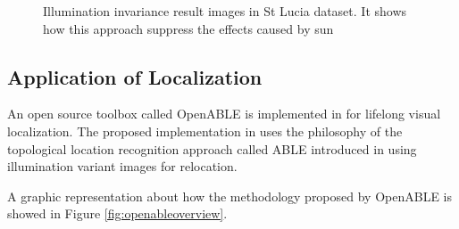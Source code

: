 \begin{figure}
	\centering
	\caption{Illumination invariance result images in St Lucia dataset. It shows how this approach suppress the effects caused by sun}
	\label{fig:iicompare1}
\end{figure}

\subsection{Application of Localization}
An open source toolbox called OpenABLE is implemented in \cite{arroyo2016openable} for lifelong visual localization. The proposed implementation in \cite{arroyo2016openable} uses the philosophy of the topological location recognition approach called ABLE introduced in \cite{arroyo2014bidirectional, arroyo2014fast, arroyo2015towards} using illumination variant images for relocation. 

A graphic representation about how the methodology proposed by OpenABLE is showed in Figure \ref{fig:openableoverview}.

